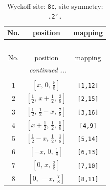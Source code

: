 \documentclass[fleqn,8pt]{jsarticle}
\begin{document}
\begin{longtable}{ccc}
\caption{Wyckoff site: {\tt 8c}, site symmetry: {\tt .2'.}}
 \\
 \hline \hline
No. & position & mapping \\ \hline \endfirsthead

\multicolumn{2}{l}{\tablename\ \thetable{}} \\
 \hline \hline
No. & position & mapping \\ \hline \endhead

 \hline \hline
\multicolumn{2}{r}{\footnotesize\it continued ...} \\ \endfoot

 \hline \hline
\multicolumn{2}{r}{} \\ \endlastfoot

1 & $\left[ x,\, 0,\, \frac{5}{8} \right]$ & {\tt [1,12]} \\ \hline
2 & $\left[ \frac{1}{2},\, x + \frac{1}{2},\, \frac{3}{8} \right]$ & {\tt [2,15]} \\ \hline
3 & $\left[ \frac{1}{2},\, \frac{1}{2} - x,\, \frac{7}{8} \right]$ & {\tt [3,16]} \\ \hline
4 & $\left[ x + \frac{1}{2},\, \frac{1}{2},\, \frac{5}{8} \right]$ & {\tt [4,9]} \\ \hline
5 & $\left[ \frac{1}{2} - x,\, \frac{1}{2},\, \frac{1}{8} \right]$ & {\tt [5,14]} \\ \hline
6 & $\left[ - x,\, 0,\, \frac{1}{8} \right]$ & {\tt [6,13]} \\ \hline
7 & $\left[ 0,\, x,\, \frac{3}{8} \right]$ & {\tt [7,10]} \\ \hline
8 & $\left[ 0,\, - x,\, \frac{7}{8} \right]$ & {\tt [8,11]} \\
\end{longtable}
\renewcommand{\arraystretch}{1.2}
\end{document}
